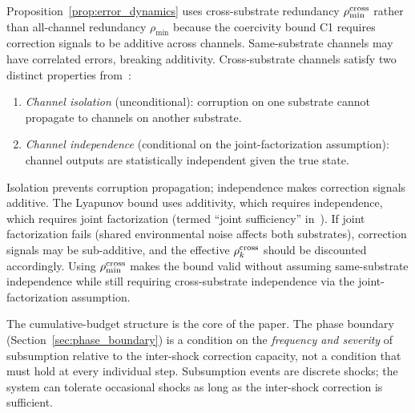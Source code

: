 \begin{remark}
\label{rem:why_cross}
Proposition~\ref{prop:error_dynamics} uses cross-substrate redundancy
$\rho_{\min}^{\mathrm{cross}}$ rather than all-channel redundancy $\rho_{\min}$ because
the coercivity bound C1 requires correction signals to be additive
across channels.  Same-substrate channels may have correlated errors,
breaking additivity.  Cross-substrate channels satisfy two
distinct properties from~\citet{lasser2026exo}:
\begin{enumerate}
\item[(a)] \emph{Channel isolation} (unconditional): corruption on one
  substrate cannot propagate to channels on another substrate.
\item[(b)] \emph{Channel independence} (conditional on the
  joint-factorization assumption): channel outputs are statistically
  independent given the true state.
\end{enumerate}
Isolation prevents corruption propagation; independence makes correction
signals additive.  The Lyapunov bound uses additivity, which requires
independence, which requires joint factorization (termed ``joint
sufficiency'' in~\citet{lasser2026exo}).  If joint factorization fails (shared
environmental noise affects both substrates), correction signals may
be sub-additive, and the effective $\rho^{\mathrm{cross}}_k$ should be discounted
accordingly.  Using $\rho_{\min}^{\mathrm{cross}}$ makes the bound valid without
assuming same-substrate independence while still requiring
cross-substrate independence via the joint-factorization assumption.
\end{remark}

\begin{remark}
The cumulative-budget structure is the core of the paper.  The phase
boundary (Section~\ref{sec:phase_boundary}) is a condition on the
\emph{frequency and severity} of subsumption relative to the
inter-shock correction capacity, not a condition that must hold at every
individual step.  Subsumption events are discrete shocks; the system can
tolerate occasional shocks as long as the inter-shock correction is
sufficient.
\end{remark}
